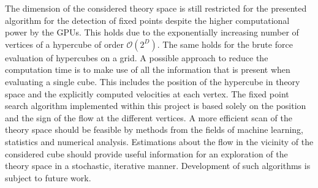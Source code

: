 \documentclass[paper=a4,11pt,bibliography=totoc]{scrartcl}
\begin{document}
The dimension of the considered theory space is still restricted for the presented algorithm for the detection of fixed points despite the higher computational power by the GPUs. This holds due to the exponentially increasing number of vertices of a hypercube of order $\mathcal{O}(2^D)$. The same holds for the brute force evaluation of hypercubes on a grid. A possible approach to reduce the computation time is to make use of all the information that is present when evaluating a single cube. This includes the position of the hypercube in theory space and the explicitly computed velocities at each vertex. The fixed point search algorithm implemented within this project is based solely on the position and the sign of the flow at the different vertices. A more efficient scan of the theory space should be feasible by methods from the fields of machine learning, statistics and numerical analysis. Estimations about the flow in the vicinity of the considered cube should provide useful information for an exploration of the theory space in a stochastic, iterative manner. Development of such algorithms is subject to future work.


%

\end{document}
